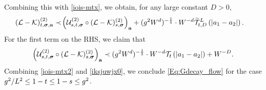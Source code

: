 Combining this with \eqref{iois-mtx}, we obtain, for any large constant $D>0$,
\begin{align}\label{iois-mtx2}
(\mathcal{L} - \mathcal{K})^{(2)}_{t, {\boldsymbol{\sigma}}, {{\mathbf{a}}}} \prec &
    \left(\mathcal{U}^{(2)}_{s, t, {\boldsymbol{\sigma}}} \circ (\mathcal{L} - \mathcal{K})^{(2)}_{s, {\boldsymbol{\sigma}}}\right)_{{{\mathbf{a}}}}+ (g^2W^{d})^{-\frac15} \cdot W^{-d}\widetilde{  \mathcal T}^{L}_{t,D}\left({|a_1-a_2|}\right).
\end{align}
For the first term on the RHS, we claim that
\begin{align}\label{iksjuwjx0}
\left(\mathcal{U}^{(2)}_{s, t, {\boldsymbol{\sigma}}} \circ (\mathcal{L} - \mathcal{K})^{(2)}_{s, {\boldsymbol{\sigma}}}\right)_{{{\mathbf{a}}}} \prec (g^2W^{d})^{-\frac15}  \cdot W^{-d} {\mathcal T}_{t}\left({|a_1-a_2|}\right)+W^{-D}.
  \end{align}
Combining \eqref{iois-mtx2} and \eqref{iksjuwjx0}, we conclude \eqref{Eq:Gdecay_flow} for the case $g^2/L^{2}\le 1- t\le 1-s \le g^2$. 

